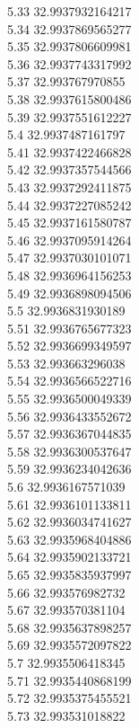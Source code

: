 {5.33	32.9937932164217\\
5.34	32.9937869565277\\
5.35	32.9937806609981\\
5.36	32.9937743317992\\
5.37	32.993767970855\\
5.38	32.9937615800486\\
5.39	32.9937551612227\\
5.4	32.9937487161797\\
5.41	32.9937422466828\\
5.42	32.9937357544566\\
5.43	32.9937292411875\\
5.44	32.9937227085242\\
5.45	32.9937161580787\\
5.46	32.9937095914264\\
5.47	32.9937030101071\\
5.48	32.9936964156253\\
5.49	32.9936898094506\\
5.5	32.9936831930189\\
5.51	32.9936765677323\\
5.52	32.9936699349597\\
5.53	32.993663296038\\
5.54	32.9936566522716\\
5.55	32.9936500049339\\
5.56	32.9936433552672\\
5.57	32.9936367044835\\
5.58	32.9936300537647\\
5.59	32.9936234042636\\
5.6	32.9936167571039\\
5.61	32.9936101133811\\
5.62	32.9936034741627\\
5.63	32.9935968404886\\
5.64	32.9935902133721\\
5.65	32.9935835937997\\
5.66	32.993576982732\\
5.67	32.993570381104\\
5.68	32.9935637898257\\
5.69	32.9935572097822\\
5.7	32.9935506418345\\
5.71	32.9935440868199\\
5.72	32.9935375455521\\
5.73	32.993531018822\\
}
